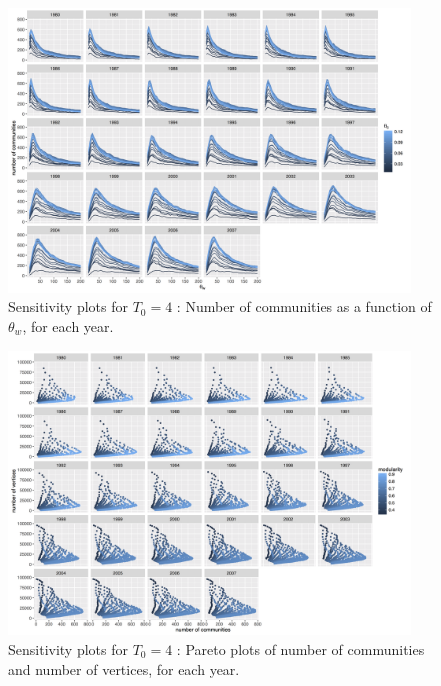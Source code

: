 \documentclass[article]{article}%
\begin{document}
\begin{figure}
	\centering
	\includegraphics[width=0.95\textwidth,height=\textwidth,angle=90]{figures/commnum_thetaw_byyears.png}
	\caption{Sensitivity plots for $T_0 = 4$ : Number of communities as a function of $\theta_w$, for each year.}
	\label{fig:ext-sensitivity-1}
\end{figure}

\begin{figure}
	\centering
	\includegraphics[width=0.95\textwidth,height=\textwidth,angle=90]{figures/vcount_comnum_pareto.png}
	\caption{Sensitivity plots for $T_0 = 4$ : Pareto plots of number of communities and number of vertices, for each year.}
	\label{fig:ext-sensitivity-2}
\end{figure}
\end{document}
